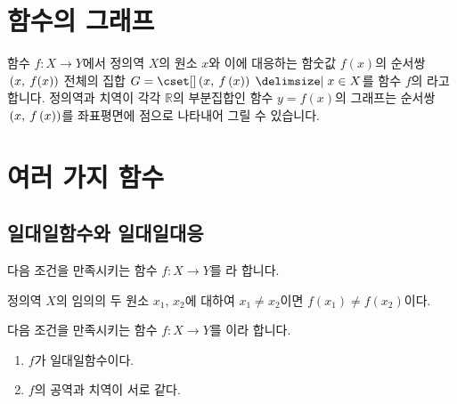\section{함수의 그래프} 
함수 $f:X \longrightarrow Y$에서 정의역 $X$의 원소 $x$와 이에 대응하는 함숫값 $f(x)$의 순서쌍 $\mathrm{}\left(x,\:f(x)\right)$ 전체의 집합 $G=\conset{\xy{x}{f\left( x \right) }}{$x \in X$}$를 함수 $f$의 라고 합니다.  정의역과 치역이 각각 $\mathbb{R}$의 부분집합인 함수 $y=f(x)$의 그래프는 순서쌍 $\mathrm{}\left(x,\:f\left( x \right) \right)$를 좌표평면에 점으로 나타내어 그릴 수 있습니다.
\clearpage
\section{여러 가지 함수}
\subsection{일대일함수와 일대일대응}
다음 조건을 만족시키는 함수 $f: X \longrightarrow Y$를 라 합니다.
\begin{justbox}
    정의역 $X$의 임의의 두 원소 $x_1$, $x_2$에 대하여 $x_1 \ne x_2$이면 $f\left( x_1 \right) \ne f\left( x_2 \right) $이다.
\end{justbox}
다음 조건을 만족시키는 함수 $f: X \longrightarrow Y$를 이라 합니다.
\begin{justbox}
    \begin{enumerate}[label=\onum*]
        \item $f$가 일대일함수이다.
        \item $f$의 공역과 치역이 서로 같다. 
    \end{enumerate}
\end{justbox}


